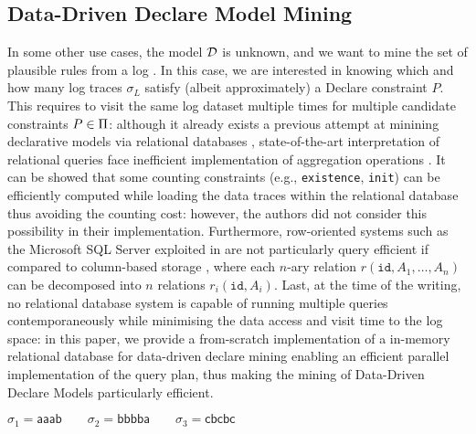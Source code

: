 \subsection{Data-Driven Declare Model Mining}\label{ref:dddmm}
In some other use cases, the model $\mathcal{D}$ is unknown, and we want to mine the set of plausible rules from a log \cite{MaggiMA11}. In this case, we are interested in knowing which and how many log traces $\sigma_L$ satisfy (albeit approximately) a Declare constraint $P$. This requires to visit the same log dataset multiple times for multiple candidate constraints $P\in\Pi$: although it already exists a previous attempt at minining declarative models via relational databases \cite{SSRSA}, state-of-the-art interpretation of relational queries face inefficient implementation of aggregation operations \cite{BergamiPM18}. It can be showed that some counting constraints (e.g., \texttt{existence}, \texttt{init}) can be efficiently computed while loading the data traces within the relational database thus avoiding the counting cost: however, the authors did not consider this possibility in their implementation. Furthermore, row-oriented systems such as the Microsoft SQL Server exploited in \cite{SSRSA} are not particularly query efficient if compared to column-based storage \cite{IdreosGNMMK12}, where each $n$-ary relation $r(\texttt{id},A_1,\dots,A_n)$ can be decomposed into $n$ relations $r_i(\texttt{id},A_i)$. Last, at the time of the writing, no relational database system is capable of running multiple queries contemporaneously while minimising the data access and visit time to the log space: in this paper, we provide a from-scratch implementation of a in-memory relational database for data-driven declare mining enabling an efficient parallel implementation of the query plan, thus making the mining of Data-Driven Declare Models particularly efficient.

$\sigma_1=\mathsf{aaab}\qquad\sigma_2=\mathsf{bbbba}\qquad\sigma_3=\mathsf{cbcbc}$
\medskip

